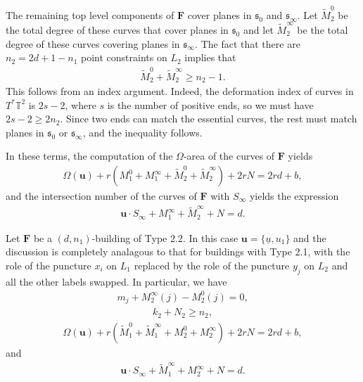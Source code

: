 \documentclass[12pt]{amsart}
\theoremstyle{definition}
\begin{document}
The remaining top level components of $\mathbf{F}$ cover planes in $\mathfrak{s}_0$ and $\mathfrak{s}_\infty$. Let $\widetilde{M}^0_2$ be the total degree of these curves that  cover planes in $\mathfrak{s}_0$ and let  $\widetilde{M}^\infty_2$ be the total degree of these curves covering planes in $\mathfrak{s}_\infty$. The fact that there are $n_2 = 2d+1-n_1$ point constraints on $L_2$ implies that 
\begin{align}\label{constraints2.1}
 \widetilde{M}^0_2+\widetilde{M}^\infty_2   \geq n_2 - 1.
\end{align}
This follows from an index argument. Indeed, the deformation index of curves in $T^*\mathbb{T}^2$ is $2s-2$, where $s$ is the number of positive ends, so we must have $2s-2 \geq 2n_2$. Since two ends can match the essential curves, the rest must match planes in $\mathfrak{s}_0$ or $\mathfrak{s}_\infty$, and the inequality follows.

In these terms, the computation of the $\Omega$-area of the curves of  $\mathbf{F}$ yields
\begin{align}\label{area2}
\Omega (\mathbf{u})+ r(M_1^0 +M_1^\infty + \widetilde{M}_2^0 + \widetilde{M}_2^\infty)+2rN = 2rd+b,  
\end{align}
and the intersection number of the curves of $\mathbf{F}$ with $S_{\infty}$ yields the expression
\begin{align}\label{S2}
\mathbf{u} \cdot S_{\infty}+ M_1^\infty + \widetilde{M}_2^\infty + N  =  d.
\end{align}

Let $\mathbf{F}$ be a $(d,n_1)$-building of Type $2.2$. In this case  $\mathbf{u} = \{\underline{u}, u_1\}$ and the discussion is completely analagous to that for buildings with Type 2.1, with the role of the puncture $x_i$ on $L_1$ replaced by the role of the puncture $y_j$ on $L_2$  and all the other labels swapped. In particular, we have
\begin{align}
 m_j+M^{\infty}_2(j)-M^0_2(j)=0,   
\end{align}
\begin{align}\label{constraint2.2}
k_2 + N_2 \geq n_2 ,
\end{align}
\begin{align}\label{area2.2}
\Omega (\mathbf{u})+ r(\widetilde{M}_1^0 +\widetilde{M}_1^\infty + M_2^0 + M_2^\infty)+2rN = 2rd+b,  
\end{align}
and 
\begin{align}\label{S2.2}
\mathbf{u} \cdot S_{\infty}+ \widetilde{M}_1^\infty + M_2^\infty + N  =  d.
\end{align}
\end{document}
